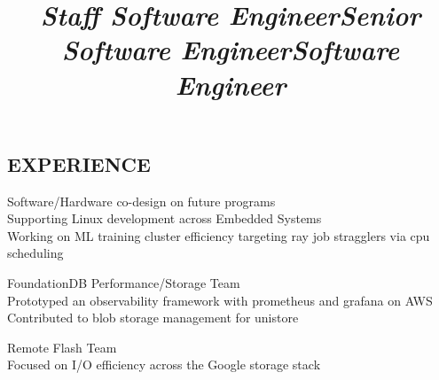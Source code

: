 \documentclass[margin,11pt]{res}
\begin{document}


\address{US Citizen}
\address{dennis@kernel.org $\bullet$ 651-442-8757}


\begin{resume}

\section{EXPERIENCE}
\title{\sl{Staff Software Engineer}}
\begin{position}
Software/Hardware co-design on future programs\\
Supporting Linux development across Embedded Systems\\
Working on ML training cluster efficiency targeting ray job stragglers via cpu scheduling
\end{position}


\title{\sl{Senior Software Engineer}}
\begin{position}
FoundationDB Performance/Storage Team\\
Prototyped an observability framework with prometheus and grafana on AWS
Contributed to blob storage management for unistore 
\end{position}

\title{\sl{Software Engineer}}
\begin{position}
Remote Flash Team\\
Focused on I/O efficiency across the Google storage stack
\end{position}


\end{resume}
\end{document}

